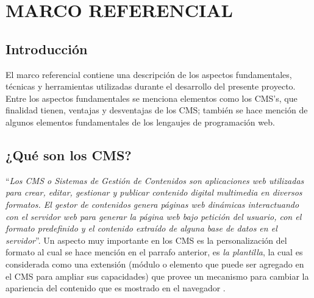 \chapter{MARCO REFERENCIAL}
\newpage

\section{Introducci\'on}
El marco referencial contiene una descripci\'on de los aspectos fundamentales, t\'ecnicas y herramientas utilizadas durante el desarrollo del presente proyecto.\\
Entre los aspectos fundamentales se menciona elementos como los CMS's, que finalidad tienen, ventajas y desventajas de los CMS; tambi\'en se hace menci\'on de algunos elementos fundamentales de los lengaujes de programaci\'on web.

\section{¿Qu\'e son los CMS?}
``\textit{Los CMS o Sistemas de Gesti\'on de Contenidos son aplicaciones web utilizadas para crear, editar, gestionar y publicar contenido digital multimedia en diversos formatos. El gestor de contenidos genera p\'aginas web din\'amicas interactuando con el servidor web para generar la p\'agina web bajo petici\'on del usuario, con el formato predefinido y el contenido extra\'ido de alguna base de datos en el servidor}''.
Un aspecto muy importante en los CMS es la personalizaci\'on del formato al cual se hace menci\'on en el parrafo anterior, es \textit{la plantilla}, la cual es considerada como una extensi\'on (m\'odulo o elemento que puede ser agregado en el CMS para ampliar sus capacidades) que provee un mecanismo para cambiar la apariencia del contenido que es mostrado en el navegador \cite{what_is_a_cms}.

